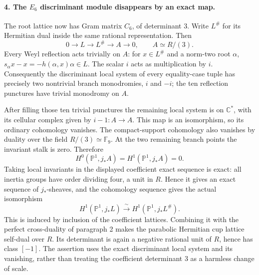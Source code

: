 \paragraph{4. The \(E_6\) discriminant module disappears by an exact map.}
The root lattice now has Gram matrix \(C_6\), of determinant 3.
Write \(L^\#\) for its Hermitian dual inside the same rational
representation. Then
\[
 0\longrightarrow L\longrightarrow L^\#
   \longrightarrow A\longrightarrow0,
 \qquad A\simeq R/(3).
\]
Every Weyl reflection acts trivially on \(A\): for \(x\in L^\#\)
and a norm-two root \(\alpha\),
\(s_\alpha x-x=-h(\alpha,x)\alpha\in L\). The scalar \(i\)
acts as multiplication by \(i\). Consequently the discriminant
local system of every equality-case tuple has precisely two
nontrivial branch monodromies, \(i\) and \(-i\); the ten
reflection punctures have trivial monodromy on \(A\).

After filling those ten trivial punctures the remaining local system
is on \(\mathbb C^*\), with its cellular complex given by
\(i-1:A\to A\). This map is an isomorphism, so its ordinary
cohomology vanishes. The compact-support cohomology also vanishes by
duality over the field \(R/(3)\simeq\mathbb F_9\). At the two
remaining branch points the invariant stalk is zero. Therefore
\[
 H^0(\mathbb P^1,j_*A)=H^1(\mathbb P^1,j_*A)=0.
\]
Taking local invariants in the displayed coefficient exact sequence
is exact: all inertia groups have order dividing four, a unit in
\(R\). Hence it gives an exact sequence of \(j_*\)-sheaves, and
the cohomology sequence gives the actual isomorphism
\[
 H^1(\mathbb P^1,j_*L)
       \xrightarrow{\ \sim\ }
 H^1(\mathbb P^1,j_*L^\#).
\]
This is induced by inclusion of the coefficient lattices. Combining
it with the perfect cross-duality of paragraph 2 makes the parabolic
Hermitian cup lattice self-dual over \(R\). Its determinant is
again a negative rational unit of \(R\), hence has class \([-1]\).
The assertion uses the exact discriminant local system and its
vanishing, rather than treating the coefficient determinant 3 as a
harmless change of scale.

